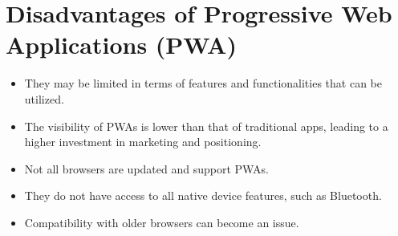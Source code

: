 \documentclass{report}
\begin{document}
\section{Disadvantages of Progressive Web Applications (PWA)}
\begin{itemize}
\item They may be limited in terms of features and functionalities that can be utilized.
\item The visibility of PWAs is lower than that of traditional apps, leading to a higher investment in marketing and positioning.
\item Not all browsers are updated and support PWAs.
\item They do not have access to all native device features, such as Bluetooth.
\item Compatibility with older browsers can become an issue.
\end{itemize}
\end{document}

